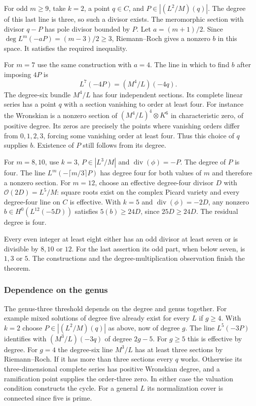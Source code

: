 For odd $m\ge9$, take $k=2$, a point $q\in C$, and $P\in|(L^2/M)(q)|$. The degree of this last line is three, so such a divisor exists. The meromorphic section with divisor $q-P$ has pole divisor bounded by $P$. Let $a=(m+1)/2$. Since $\deg L^m(-aP)=(m-3)/2\ge3$, Riemann–Roch gives a nonzero $b$ in this space. It satisfies the required inequality.

For $m=7$ use the same construction with $a=4$. The line in which to find $b$ after imposing $4P$ is
\[
 L^7(-4P)=(M^4/L)(-4q).
\]
The degree-six bundle $M^4/L$ has four independent sections. Its complete linear series has a point $q$ with a section vanishing to order at least four. For instance the Wronskian is a nonzero section of $(M^4/L)^4\otimes K^6$ in characteristic zero, of positive degree. Its zeros are precisely the points where vanishing orders differ from $0,1,2,3$, forcing some vanishing order at least four. Thus this choice of $q$ supplies $b$. Existence of $P$ still follows from its degree.

For $m=8,10$, use $k=3$, $P\in|L^3/M|$ and $\operatorname{div}(\phi)=-P$. The degree of $P$ is four. The line $L^m(-\lceil m/3\rceil P)$ has degree four for both values of $m$ and therefore a nonzero section. For $m=12$, choose an effective degree-four divisor $D$ with $\mathcal O(2D)=L^5/M$: square roots exist on the complex Picard variety and every degree-four line on $C$ is effective. With $k=5$ and $\operatorname{div}(\phi)=-2D$, any nonzero $b\in H^0(L^{12}(-5D))$ satisfies $5(b)\ge24D$, since $25D\ge24D$. The residual degree is four.

Every even integer at least eight either has an odd divisor at least seven or is divisible by $8,10$ or $12$. For the last assertion its odd part, when below seven, is $1,3$ or $5$. The constructions and the degree-multiplication observation finish the theorem. 

\subsubsection{Dependence on the genus}

The genus-three threshold depends on the degree and genus together. For example mixed solutions of degree five already exist for every $L$ if $g\ge4$. With $k=2$ choose $P\in |(L^2/M)(q)|$ as above, now of degree $g$. The line $L^5(-3P)$ identifies with $(M^3/L)(-3q)$ of degree $2g-5$. For $g\ge5$ this is effective by degree. For $g=4$ the degree-six line $M^3/L$ has at least three sections by Riemann–Roch. If it has more than three sections every $q$ works. Otherwise its three-dimensional complete series has positive Wronskian degree, and a ramification point supplies the order-three zero. In either case the valuation condition constructs the cycle. For a general $L$ its normalization cover is connected since five is prime.

